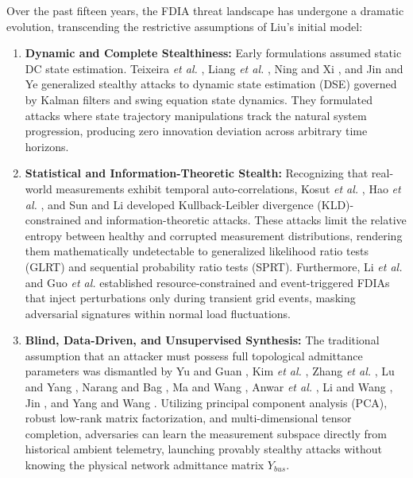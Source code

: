 \documentclass[journal,compsoc]{IEEEtran}
\begin{document}
Over the past fifteen years, the FDIA threat landscape has undergone a dramatic evolution, transcending the restrictive assumptions of Liu's initial model:
\begin{enumerate}
    \item \textbf{Dynamic and Complete Stealthiness:} Early formulations assumed static DC state estimation. Teixeira \textit{et al.} \cite{ref19}, Liang \textit{et al.} \cite{ref30}, Ning and Xi \cite{ref33}, and Jin and Ye \cite{ref26} generalized stealthy attacks to dynamic state estimation (DSE) governed by Kalman filters and swing equation state dynamics. They formulated attacks where state trajectory manipulations track the natural system progression, producing zero innovation deviation across arbitrary time horizons.
    \item \textbf{Statistical and Information-Theoretic Stealth:} Recognizing that real-world measurements exhibit temporal auto-correlations, Kosut \textit{et al.} \cite{ref7}, Hao \textit{et al.} \cite{ref11}, and Sun and Li \cite{ref63} developed Kullback-Leibler divergence (KLD)-constrained and information-theoretic attacks. These attacks limit the relative entropy between healthy and corrupted measurement distributions, rendering them mathematically undetectable to generalized likelihood ratio tests (GLRT) and sequential probability ratio tests (SPRT). Furthermore, Li \textit{et al.} \cite{ref25} and Guo \textit{et al.} \cite{ref76} established resource-constrained and event-triggered FDIAs that inject perturbations only during transient grid events, masking adversarial signatures within normal load fluctuations.
    \item \textbf{Blind, Data-Driven, and Unsupervised Synthesis:} The traditional assumption that an attacker must possess full topological admittance parameters was dismantled by Yu and Guan \cite{ref56}, Kim \textit{et al.} \cite{ref48}, Zhang \textit{et al.} \cite{ref59}, Lu and Yang \cite{ref31}, Narang and Bag \cite{ref32}, Ma and Wang \cite{ref39}, Anwar \textit{et al.} \cite{ref41}, Li and Wang \cite{ref49}, Jin \cite{ref27}, and Yang and Wang \cite{ref77}. Utilizing principal component analysis (PCA), robust low-rank matrix factorization, and multi-dimensional tensor completion, adversaries can learn the measurement subspace directly from historical ambient telemetry, launching provably stealthy attacks without knowing the physical network admittance matrix $Y_{bus}$.

\end{enumerate}
\end{document}
